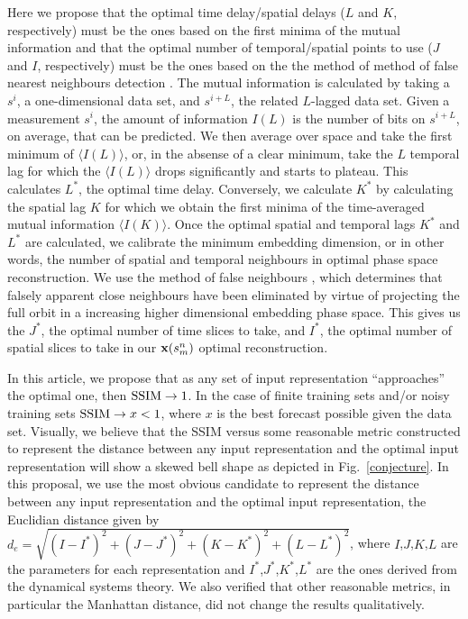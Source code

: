\documentclass[journal]{IEEEtran}
\begin{document}
Here we propose that the optimal time delay/spatial delays ($L$ and $K$, respectively) must be the ones based on the first minima of the mutual 
information \cite{Fraser86, abarbanel1997analysis, opac-b1092652} and that the optimal number of temporal/spatial points to use ($J$ and $I$, 
respectively) must be the ones based on the  the method of method of false nearest neighbours detection \cite{1992PhRvA..45.3403K, 
1992PhRvA..45.7058M, 1993RvMP...65.1331A, 1996PhT....49k..86A, abarbanel1997analysis}.  The mutual information is calculated by taking a $s^{i}$, a 
one-dimensional data set, and $s^{i+L}$, the related $L$-lagged data set. Given a measurement $s^i$, the amount of information $I(L)$ is the number 
of bits on $s^{i+L}$, on average, that can be predicted. We then average over space and take the first minimum of $\langle I(L) \rangle$, or, in the 
absense of a clear minimum, take the $L$ temporal lag for which the $\langle I(L) \rangle$ drops significantly and starts to plateau. This calculates 
$L^*$, the optimal time delay. Conversely, we calculate $K^*$ by calculating the spatial lag $K$ for which we obtain the first minima of the 
time-averaged mutual information $\langle I(K) \rangle$. Once the optimal spatial and temporal lags $K^*$ and $L^*$ are calculated, we calibrate 
the minimum embedding dimension, or in other words, the number of spatial and temporal neighbours in optimal  
phase space reconstruction. We use the method of false neighbours \cite{1992PhRvA..45.3403K, 1992PhRvA..45.7058M,1993RvMP...65.1331A},
which determines that falsely apparent close neighbours have been 
eliminated by virtue of projecting the full orbit in a increasing higher dimensional embedding phase space. This gives us the 
$J^*$, the optimal number of time slices to take,
and $I^*$, the optimal number of spatial slices to take in our ${\bf x}(s^n_m)$ optimal reconstruction.

In this article, we propose that as any set of input representation 
``approaches'' the optimal one, then $\textnormal{SSIM} \to 1$. In the case of finite training sets and/or noisy training sets  
$\textnormal{SSIM} \to x<1$, where $x$ is the best forecast possible given the data set. Visually, we believe that the SSIM versus some reasonable 
metric constructed to represent the distance between any input representation and the optimal input representation will show a skewed bell shape 
as depicted in Fig.\ \ref{conjecture}. In this proposal, we use the most obvious candidate to represent the distance between any input 
representation and the optimal   input representation, the Euclidian distance given by   
$d_e=\sqrt{(I-I^*)^2+(J-J^*)^2+(K-K^*)^2+(L-L^*)^2}$, where $I$,$J$,$K$,$L$ are the parameters for each representation
and $I^*$,$J^*$,$K^*$,$L^*$ are the ones derived from the dynamical systems theory. We also verified that other reasonable metrics,   
in particular the Manhattan distance\cite{0486252027}, did 
not change the results qualitatively.
 
\end{document}
